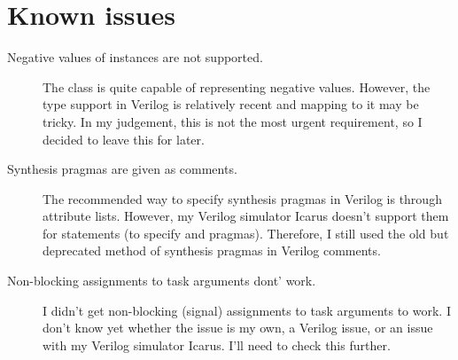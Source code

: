 \documentclass{howto}
\begin{document}
\section{Known issues}
\begin{description}

\item[Negative values of  instances are not supported.]
The  class is quite capable of representing negative
values. However, the  type support in Verilog is
relatively recent and mapping to it may be tricky. In my judgement,
this is not the most urgent requirement, so
I decided to leave this for later.

\item[Synthesis pragmas are given as comments.] The recommended
way to specify synthesis pragmas in Verilog is through attribute
lists. However, my Verilog simulator Icarus doesn't support them
for  statements (to specify  and
 pragmas). Therefore, I still used the old
but deprecated method of synthesis pragmas in Verilog comments.

\item[Non-blocking assignments to task arguments dont' work.] 
I didn't get non-blocking (signal) assignments to task arguments to
work.  I don't know yet whether the issue is my own, a Verilog issue,
or an issue with my Verilog simulator Icarus. I'll need to check this
further.


\end{description}
\end{document}
